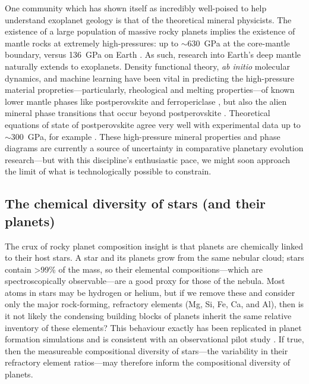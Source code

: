 One community which has shown itself as incredibly well-poised to help understand exoplanet geology is that of the theoretical mineral physicists. The existence of a large population of massive rocky planets implies the existence of mantle rocks at extremely high-pressures: up to $\sim$630~GPa at the core-mantle boundary, versus 136~GPa on Earth \citep{unterborn_pressure_2019}. As such, research into Earth's deep mantle naturally extends to exoplanets. Density functional theory, \textit{ab initio} molecular dynamics, and machine learning have been vital in predicting the high-pressure material propreties---particularly, rheological and melting properties---of known lower mantle phases like postperovskite and ferropericlase \citep[e.g.,][]{tackley_mantle_2013, stixrude_melting_2014, millot_shock_2015, sakai_experimental_2016, ritterbex_vacancies_2018}, but also the alien mineral phase transitions that occur beyond postperovskite \citep[e.g.,][]{umemoto_twostage_2011, umemoto_phase_2017, coppari_implications_2021}. Theoretical equations of state of postperovskite agree very well with experimental data up to $\sim$300~GPa, for example \citep{sakai_experimental_2016}. These high-pressure mineral properties and phase diagrams are currently a source of uncertainty in comparative planetary evolution research---but with this discipline's enthusiastic pace, we might soon approach the limit of what is technologically possible to constrain.




\subsection{The chemical diversity of stars (and their planets)}
\label{sec:background-starchem}

The crux of rocky planet composition insight is that planets are chemically linked to their host stars. A star and its planets grow from the same nebular cloud; stars contain \textgreater 99\% of the mass, so their elemental compositions---which are spectroscopically observable---are a good proxy for those of the nebula. Most atoms in stars may be hydrogen or helium, but if we remove these and consider only the major rock-forming, refractory elements (Mg, Si, Fe, Ca, and Al), then is it not likely the condensing building blocks of planets inherit the same relative inventory of these elements? This behaviour exactly has been replicated in planet formation simulations \citep{bond_compositional_2010, thiabaud_elemental_2015} and is consistent with an observational pilot study \citep[discussed below;][]{bonsor_hoststar_2021}. If true, then the measureable compositional diversity of stars---the variability in their refractory element ratios---may therefore inform the compositional diversity of planets. 


